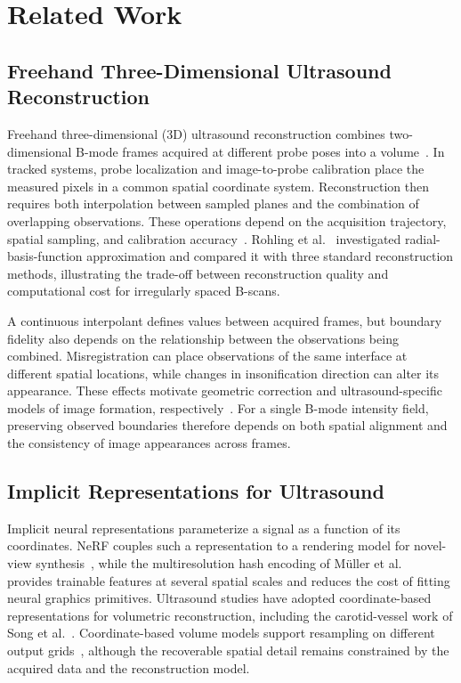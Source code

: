 \section{Related Work}
\label{sec:related-work}

\subsection{Freehand Three-Dimensional Ultrasound Reconstruction}

Freehand three-dimensional (3D) ultrasound reconstruction combines two-dimensional B-mode frames acquired at different probe poses into a volume~\cite{prager2010three}. In tracked systems, probe localization and image-to-probe calibration place the measured pixels in a common spatial coordinate system. Reconstruction then requires both interpolation between sampled planes and the combination of overlapping observations. These operations depend on the acquisition trajectory, spatial sampling, and calibration accuracy~\cite{solberg2007freehand}. Rohling et al.~\cite{rohling1999interpolation} investigated radial-basis-function approximation and compared it with three standard reconstruction methods, illustrating the trade-off between reconstruction quality and computational cost for irregularly spaced B-scans.

A continuous interpolant defines values between acquired frames, but boundary fidelity also depends on the relationship between the observations being combined. Misregistration can place observations of the same interface at different spatial locations, while changes in insonification direction can alter its appearance. These effects motivate geometric correction and ultrasound-specific models of image formation, respectively~\cite{dou2026gau,wysocki2024ultranerf}. For a single B-mode intensity field, preserving observed boundaries therefore depends on both spatial alignment and the consistency of image appearances across frames.

\subsection{Implicit Representations for Ultrasound}

Implicit neural representations parameterize a signal as a function of its coordinates. NeRF couples such a representation to a rendering model for novel-view synthesis~\cite{mildenhall2020nerf}, while the multiresolution hash encoding of M\"uller et al.~\cite{mueller2022instant} provides trainable features at several spatial scales and reduces the cost of fitting neural graphics primitives. Ultrasound studies have adopted coordinate-based representations for volumetric reconstruction, including the carotid-vessel work of Song et al.~\cite{song2022carotid}. Coordinate-based volume models support resampling on different output grids~\cite{yeung2024sensorless}, although the recoverable spatial detail remains constrained by the acquired data and the reconstruction model.

